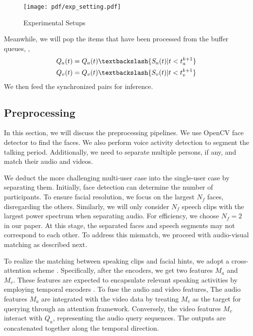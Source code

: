 \begin{figure}[t]
    \centering
    \texttt{[image: pdf/exp\_setting.pdf]}
    \caption{Experimental Setups}
    \label{fig:exp_set}
\end{figure}
 Meanwhile, we will pop the items that have been processed from the buffer queues, \ie, 
 \begin{equation}
     \begin{aligned}
         Q_{a}(t) &= Q_{a}(t) \textbackslash \{S_a(t) | t < t_{a}^{k+1}\} \\
         Q_{v}(t) &= Q_{v}(t) \textbackslash \{S_v(t) | t < t_{v}^{k+1}\}
     \end{aligned}
 \end{equation}
We then feed the synchronized pairs for inference.

\subsection{Preprocessing}
\label{subsec: preprocess}
In this section, we will discuss the preprocessing pipelines. 
We use OpenCV face detector to find the faces. We also perform voice activity detection to segment the talking period. Additionally, we need to separate multiple persons, if any, and match their audio and videos.

We deduct the more challenging multi-user case into the single-user case by separating them. 
Initially, face detection can determine the number of participants. To ensure facial resolution, we focus on the largest $N_f$ faces, disregarding the others. 
Similarly, we will only consider $N_f$ speech clips with the largest power spectrum when separating audio. For efficiency, we choose $N_f=2$ in our paper. At this stage, the separated faces and speech segments may not correspond to each other. To address this mismatch, we proceed with audio-visual matching as described next.




To realize the matching between speaking clips and facial hints, we adopt a cross-attention scheme \cite{tao2021someone, jiang2023target}. Specifically, after the encoders, we get two features $M_a$ and $M_v$. These features are expected to encapsulate relevant speaking activities by employing temporal encoders \cite{hu2018squeeze, afouras2018conversation}. To fuse the audio and video features, The audio features $M_a$ are integrated with the video data by treating $M_v$ as the target for querying through an attention framework. Conversely, the video features $M_v$ interact with $Q_a$, representing the audio query sequences. The outputs are concatenated together along the temporal direction.

